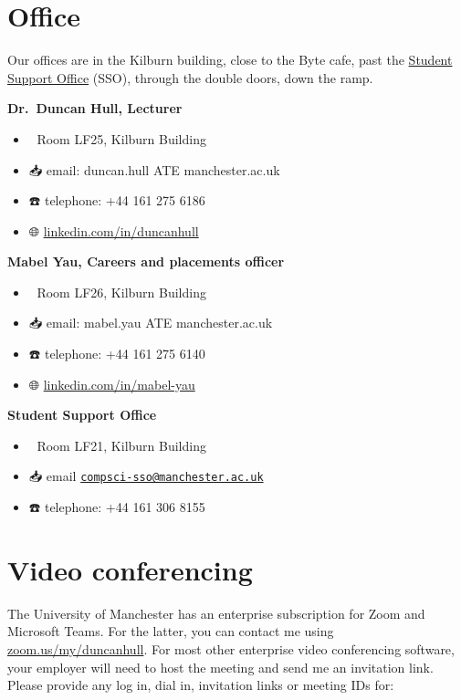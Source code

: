 \documentclass[
  12pt,
]{book}
\providecommand{\tightlist}{%
  \setlength{\itemsep}{0pt}\setlength{\parskip}{0pt}}
\begin{document}
\hypertarget{office}{%
\section{Office}\label{office}}

Our offices are in the Kilburn building, close to the Byte cafe, past the \href{https://studentnet.cs.manchester.ac.uk/student-services/}{Student Support Office} (SSO), through the double doors, down the ramp.

\textbf{Dr.~Duncan Hull, Lecturer} 👨‍💻

\begin{itemize}
\tightlist
\item
  🏢 Room LF25, Kilburn Building
\item
  📥 email: duncan.hull ATE manchester.ac.uk
\item
  ☎️ telephone: +44 161 275 6186
\item
  🌐 \href{https://uk.linkedin.com/in/duncanhull}{linkedin.com/in/duncanhull}
\end{itemize}

\textbf{Mabel Yau, Careers and placements officer} 👩‍💻

\begin{itemize}
\tightlist
\item
  🏢 Room LF26, Kilburn Building
\item
  📥 email: mabel.yau ATE manchester.ac.uk
\item
  ☎️ telephone: +44 161 275 6140
\item
  🌐 \href{https://uk.linkedin.com/in/mabel-yau}{linkedin.com/in/mabel-yau}
\end{itemize}

\textbf{Student Support Office } 👨‍👩‍👧‍👧

\begin{itemize}
\tightlist
\item
  🏢 Room LF21, Kilburn Building
\item
  📥 email \href{mailto:compsci-sso@manchester.ac.uk}{\nolinkurl{compsci-sso@manchester.ac.uk}}
\item
  ☎️ telephone: +44 161 306 8155
\end{itemize}

\hypertarget{video-conferencing}{%
\section{Video conferencing}\label{video-conferencing}}

The University of Manchester has an enterprise subscription for Zoom and Microsoft Teams. For the latter, you can contact me using \href{https://zoom.us/my/duncanhull}{zoom.us/my/duncanhull}. For most other enterprise video conferencing software, your employer will need to host the meeting and send me an invitation link. Please provide any log in, dial in, invitation links or meeting IDs for:
\end{document}

